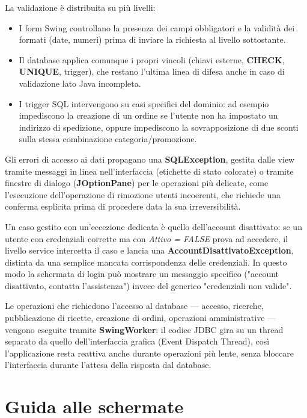 La validazione è distribuita su più livelli:
\begin{itemize}
    \item I form Swing controllano la presenza dei campi obbligatori e la validità dei formati (date, numeri) prima di inviare la richiesta al livello sottostante.
    \item Il database applica comunque i propri vincoli (chiavi esterne, \textbf{CHECK}, \textbf{UNIQUE}, trigger), che restano l'ultima linea di difesa anche in caso di validazione lato Java incompleta.
    \item I trigger SQL intervengono su casi specifici del dominio: ad esempio impediscono la creazione di un ordine se l'utente non ha impostato un indirizzo di spedizione, oppure impediscono la sovrapposizione di due sconti sulla stessa combinazione categoria/promozione.
\end{itemize}

Gli errori di accesso ai dati propagano una \textbf{SQLException}, gestita dalle view tramite messaggi in linea nell'interfaccia (etichette di stato colorate) o tramite finestre di dialogo (\textbf{JOptionPane}) per le operazioni più delicate, come l'esecuzione dell'operazione di rimozione utenti incoerenti, che richiede una conferma esplicita prima di procedere data la sua irreversibilità.

Un caso gestito con un'eccezione dedicata è quello dell'account disattivato: se un utente con credenziali corrette ma con \textit{Attivo = FALSE} prova ad accedere, il livello service intercetta il caso e lancia una \textbf{AccountDisattivatoException}, distinta da una semplice mancata corrispondenza delle credenziali. In questo modo la schermata di login può mostrare un messaggio specifico ("account disattivato, contatta l'assistenza") invece del generico "credenziali non valide".

Le operazioni che richiedono l'accesso al database — accesso, ricerche, pubblicazione di ricette, creazione di ordini, operazioni amministrative — vengono eseguite tramite \textbf{SwingWorker}: il codice JDBC gira su un thread separato da quello dell'interfaccia grafica (Event Dispatch Thread), così l'applicazione resta reattiva anche durante operazioni più lente, senza bloccare l'interfaccia durante l'attesa della risposta dal database.
\vspace{1em}

\section{Guida alle schermate}

